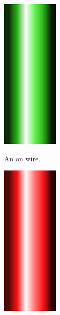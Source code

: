 \documentclass[12pt]{book}
\begin{document}
			\begin{figure}[h]
				\centering
				\begin{subfigure}[t]{0.3\textwidth}
					\centering
					\includegraphics[width=0.3\textwidth]{ON}

					An on wire.
				\end{subfigure}
				\hspace{1mm}
				\begin{subfigure}[t]{0.3\textwidth}
					\centering
					\includegraphics[width=0.3\textwidth]{OFF}


\end{subfigure}
\end{figure}
\end{document}

